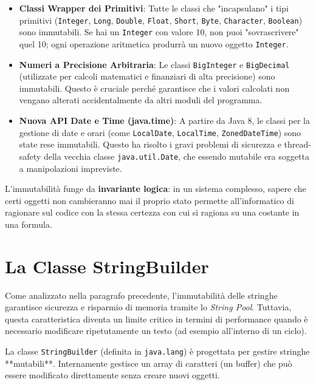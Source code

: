 \begin{itemize}
    \item \textbf{Classi Wrapper dei Primitivi}: Tutte le classi che "incapsulano" i tipi primitivi (\texttt{Integer}, \texttt{Long}, \texttt{Double}, \texttt{Float}, \texttt{Short}, \texttt{Byte}, \texttt{Character}, \texttt{Boolean}) sono immutabili. Se hai un \texttt{Integer} con valore 10, non puoi "sovrascrivere" quel 10; ogni operazione aritmetica produrrà un nuovo oggetto \texttt{Integer}.
    
    \item \textbf{Numeri a Precisione Arbitraria}: Le classi \texttt{BigInteger} e \texttt{BigDecimal} (utilizzate per calcoli matematici e finanziari di alta precisione) sono immutabili. Questo è cruciale perché garantisce che i valori calcolati non vengano alterati accidentalmente da altri moduli del programma.

    \item \textbf{Nuova API Date e Time (java.time)}: A partire da Java 8, le classi per la gestione di date e orari (come \texttt{LocalDate}, \texttt{LocalTime}, \texttt{ZonedDateTime}) sono state rese immutabili. Questo ha risolto i gravi problemi di sicurezza e thread-safety della vecchia classe \texttt{java.util.Date}, che essendo mutabile era soggetta a manipolazioni impreviste.
\end{itemize}


\begin{observation}
L'immutabilità funge da \textbf{invariante logica}: in un sistema complesso, sapere che certi oggetti non cambieranno mai il proprio stato permette all'informatico di ragionare sul codice con la stessa certezza con cui si ragiona su una costante in una formula.
\end{observation}

\section{La Classe StringBuilder}

Come analizzato nella paragrafo precedente, l'immutabilità delle stringhe garantisce sicurezza e risparmio di memoria tramite lo \textit{String Pool}. Tuttavia, questa caratteristica diventa un limite critico in termini di performance quando è necessario modificare ripetutamente un testo (ad esempio all'interno di un ciclo).

La classe \texttt{StringBuilder} (definita in \texttt{java.lang}) è progettata per gestire stringhe **mutabili**. Internamente gestisce un array di caratteri (un buffer) che può essere modificato direttamente senza creare nuovi oggetti.

